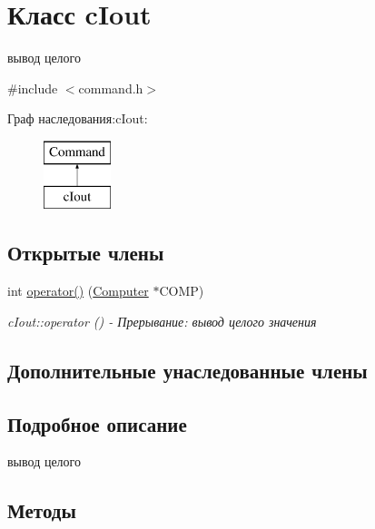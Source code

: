 \hypertarget{classc_iout}{}\section{Класс c\+Iout}
\label{classc_iout}


вывод целого  




{\ttfamily \#include $<$command.\+h$>$}

Граф наследования\+:c\+Iout\+:\begin{figure}[H]
\begin{center}
\leavevmode
\includegraphics[height=2.000000cm]{classc_iout}
\end{center}
\end{figure}
\subsection*{Открытые члены}
\begin{DoxyCompactItemize}
\item 
int \hyperlink{classc_iout_a82536616889a02f99211d79920bad3dd}{operator()} (\hyperlink{class_computer}{Computer} $\ast$C\+O\+MP)
\begin{DoxyCompactList}\small\item\em c\+Iout\+::operator () -\/ Прерывание\+: вывод целого значения \end{DoxyCompactList}\end{DoxyCompactItemize}
\subsection*{Дополнительные унаследованные члены}


\subsection{Подробное описание}
вывод целого 

\subsection{Методы}
\hypertarget{classc_iout_a82536616889a02f99211d79920bad3dd}{}\label{classc_iout_a82536616889a02f99211d79920bad3dd} 
